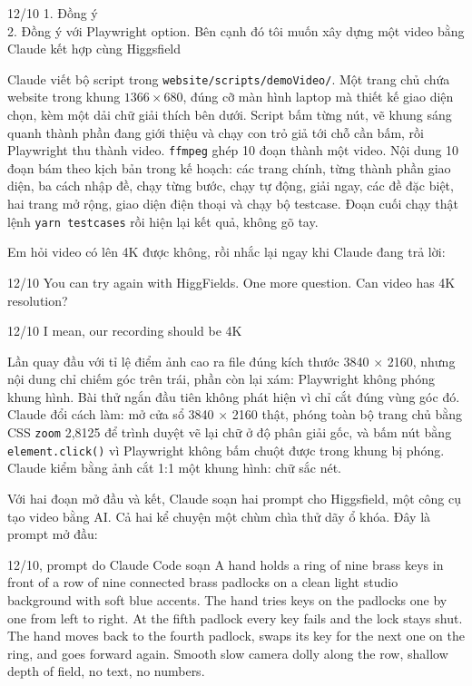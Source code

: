 \begin{promptbox}{12/10}
1. Đồng ý\\
2. Đồng ý với Playwright option. Bên cạnh đó tôi muốn xây dựng một video bằng Claude kết hợp cùng Higgsfield
\end{promptbox}

Claude viết bộ script trong \texttt{website/scripts/demoVideo/}. Một trang chủ chứa website trong khung \(1366 \times 680\), đúng cỡ màn hình laptop mà thiết kế giao diện chọn, kèm một dải chữ giải thích bên dưới. Script bấm từng nút, vẽ khung sáng quanh thành phần đang giới thiệu và chạy con trỏ giả tới chỗ cần bấm, rồi Playwright thu thành video. \texttt{ffmpeg} ghép 10 đoạn thành một video. Nội dung 10 đoạn bám theo kịch bản trong kế hoạch: các trang chính, từng thành phần giao diện, ba cách nhập đề, chạy từng bước, chạy tự động, giải ngay, các đề đặc biệt, hai trang mở rộng, giao diện điện thoại và chạy bộ testcase. Đoạn cuối chạy thật lệnh \texttt{yarn testcases} rồi hiện lại kết quả, không gõ tay.

Em hỏi video có lên 4K được không, rồi nhắc lại ngay khi Claude đang trả lời:

\begin{promptbox}{12/10}
You can try again with HiggFields. One more question. Can video has 4K resolution?
\end{promptbox}

\begin{promptbox}{12/10}
I mean, our recording should be 4K
\end{promptbox}

Lần quay đầu với tỉ lệ điểm ảnh cao ra file đúng kích thước 3840 \(\times\) 2160, nhưng nội dung chỉ chiếm góc trên trái, phần còn lại xám: Playwright không phóng khung hình. Bài thử ngắn đầu tiên không phát hiện vì chỉ cắt đúng vùng góc đó. Claude đổi cách làm: mở cửa sổ 3840 \(\times\) 2160 thật, phóng toàn bộ trang chủ bằng CSS \texttt{zoom} 2,8125 để trình duyệt vẽ lại chữ ở độ phân giải gốc, và bấm nút bằng \texttt{element.click()} vì Playwright không bấm chuột được trong khung bị phóng. Claude kiểm bằng ảnh cắt 1:1 một khung hình: chữ sắc nét.

Với hai đoạn mở đầu và kết, Claude soạn hai prompt cho Higgsfield, một công cụ tạo video bằng AI. Cả hai kể chuyện một chùm chìa thử dãy ổ khóa. Đây là prompt mở đầu:

\begin{promptbox}{12/10, prompt do Claude Code soạn}
A hand holds a ring of nine brass keys in front of a row of nine connected brass padlocks on a clean light studio background with soft blue accents. The hand tries keys on the padlocks one by one from left to right. At the fifth padlock every key fails and the lock stays shut. The hand moves back to the fourth padlock, swaps its key for the next one on the ring, and goes forward again. Smooth slow camera dolly along the row, shallow depth of field, no text, no numbers.
\end{promptbox}

